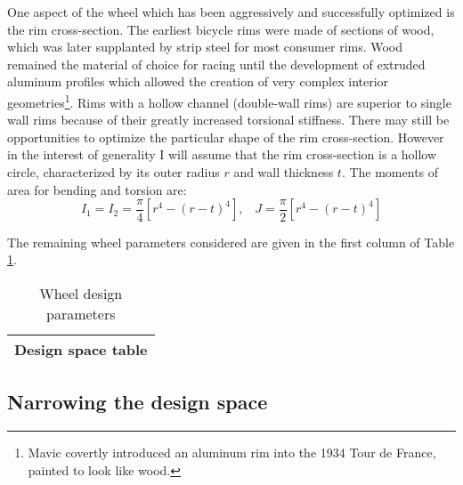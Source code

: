 \documentclass[\rootdir/thesis.tex]{subfiles}
\begin{document}
One aspect of the wheel which has been aggressively and successfully optimized is the rim cross-section. The earliest bicycle rims were made of sections of wood, which was later supplanted by strip steel for most consumer rims. Wood remained the material of choice for racing until the development of extruded aluminum profiles which allowed the creation of very complex interior geometries\footnote{Mavic covertly introduced an aluminum rim into the 1934 Tour de France, painted to look like wood.}. Rims with a hollow channel (double-wall rims) are superior to single wall rims because of their greatly increased torsional stiffness. There may still be opportunities to optimize the particular shape of the rim cross-section. However in the interest of generality I will assume that the rim cross-section is a hollow circle, characterized by its outer radius $r$ and wall thickness $t$. The moments of area for bending and torsion are:
\begin{equation}
I_1 = I_2 = \frac{\pi}{4} [r^4 - (r-t)^4], \,\,\,\,\, J = \frac{\pi}{2} [r^4 - (r-t)^4]
\end{equation}

The remaining wheel parameters considered are given in the first column of Table \ref{tab:design_space}.

\begin{table}
\caption{Wheel design parameters}
\label{tab:design_space}
\begin{tabularx}{\textwidth}{c}
\hline
Design space table\\
\hline
\end{tabularx}
\end{table}


\subsection{Narrowing the design space}
\end{document}
